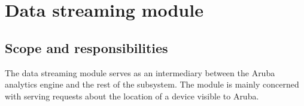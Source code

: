 \section{Data streaming module}
\subsection{Scope and responsibilities}
The data streaming module serves as an intermediary between the Aruba analytics engine and the rest of the subsystem. The module is mainly concerned with serving requests about the location of a device visible to Aruba.



